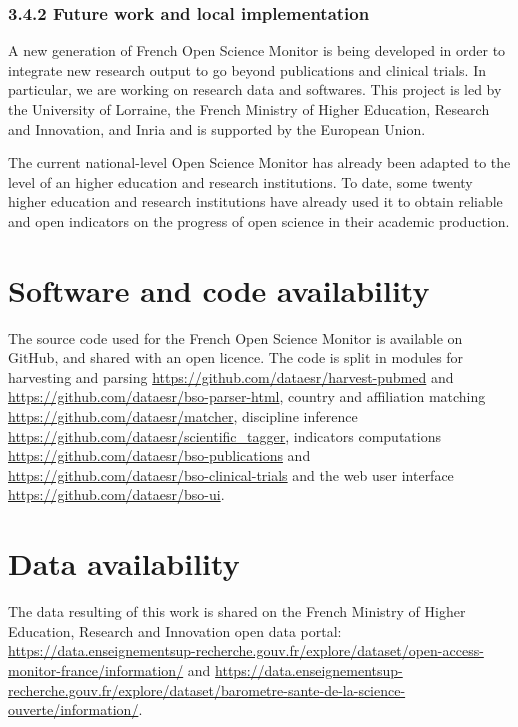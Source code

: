 \documentclass[
]{article}
\begin{document}
\hypertarget{future-work-and-local-implementation}{%
\subsubsection{3.4.2 Future work and local
implementation}\label{future-work-and-local-implementation}}

A new generation of French Open Science Monitor is being developed in
order to integrate new research output to go beyond publications and
clinical trials. In particular, we are working on research data and
softwares. This project is led by the University of Lorraine, the French
Ministry of Higher Education, Research and Innovation, and Inria and is
supported by the European Union.

The current national-level Open Science Monitor has already been adapted
to the level of an higher education and research institutions. To date,
some twenty higher education and research institutions have already used
it to obtain reliable and open indicators on the progress of open
science in their academic production.

\hypertarget{software-and-code-availability}{%
\section{Software and code
availability}\label{software-and-code-availability}}

The source code used for the French Open Science Monitor is available on
GitHub, and shared with an open licence. The code is split in modules
for harvesting and parsing
\url{https://github.com/dataesr/harvest-pubmed} and
\url{https://github.com/dataesr/bso-parser-html}, country and
affiliation matching \url{https://github.com/dataesr/matcher},
discipline inference \url{https://github.com/dataesr/scientific_tagger},
indicators computations
\url{https://github.com/dataesr/bso-publications} and
\url{https://github.com/dataesr/bso-clinical-trials} and the web user
interface \url{https://github.com/dataesr/bso-ui}.

\hypertarget{data-availability}{%
\section{Data availability}\label{data-availability}}

The data resulting of this work is shared on the French Ministry of
Higher Education, Research and Innovation open data portal:
\url{https://data.enseignementsup-recherche.gouv.fr/explore/dataset/open-access-monitor-france/information/}
and
\url{https://data.enseignementsup-recherche.gouv.fr/explore/dataset/barometre-sante-de-la-science-ouverte/information/}.
\end{document}
